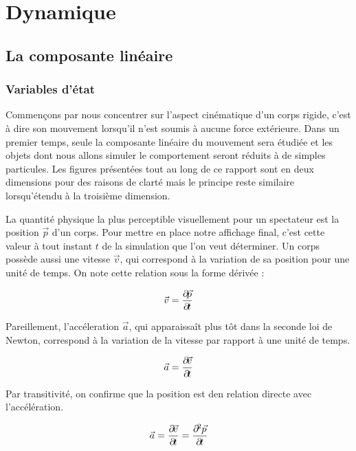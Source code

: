 \section{Dynamique} 

\subsection{La composante linéaire}

\subsubsection{Variables d'état}

Commençons par nous concentrer sur l'aspect cinématique d'un corps
rigide, c'est à dire son mouvement lorsqu'il n'est soumis à aucune
force extérieure. Dans un premier temps, seule la composante linéaire
du mouvement sera étudiée et les objets dont nous allons simuler le
comportement seront réduits à de simples particules. Les figures
présentées tout au long de ce rapport sont en deux dimensions pour des
raisons de clarté mais le principe reste similaire lorsqu'étendu à la
troisième dimension.

La quantité physique la plus perceptible visuellement pour un
spectateur est la position $\vec p$ d'un corps. Pour mettre en place
notre affichage final, c'est cette valeur à tout instant $t$ de la
simulation que l'on veut déterminer. Un corps possède aussi une
vitesse $\vec v$, qui correspond à la variation de sa position pour
une unité de temps. On note cette relation sous la forme dérivée :

\begin{align*}
  \vec{v} = \frac{\partial \! \vec{p}}{\partial \! t} \\
\end{align*}

Pareillement, l'accéleration $\vec a$, qui apparaissaît plus tôt dans
la seconde loi de Newton, correspond à la variation de la vitesse par
rapport à une unité de temps.

\begin{align*}
  \vec{a} = \frac{\partial \! \vec{v}}{\partial \! t} \\
\end{align*}

Par transitivité, on confirme que la position est den relation directe
avec l'accélération.

\begin{align*}
  \vec{a} = \frac{\partial \! \vec{v}}{\partial \! t} = \frac{\partial \!^2 \vec{p}}{\partial \! t} \\
\end{align*}

